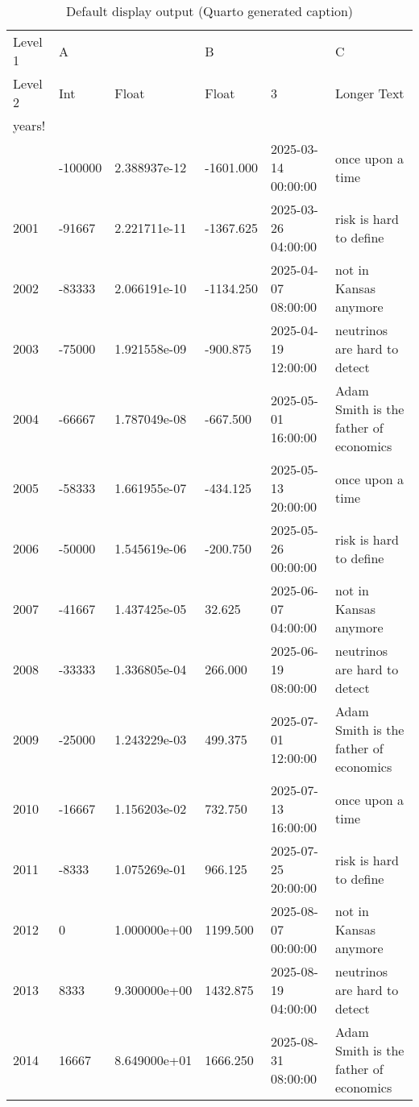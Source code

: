 \documentclass[
  11pt,
  a4paper,
  DIV=11,
  numbers=noendperiod]{scrartcl}
\begin{document}
\begin{longtable}[]{@{}llllll@{}}

\caption{\label{tbl-hard-rules}Default display output (Quarto generated
caption)}

\tabularnewline

\toprule\noalign{}
Level 1 & \multicolumn{2}{l}{%
A} & \multicolumn{2}{l}{%
B} & C \\
Level 2 & Int & Float & Float & 3 & Longer Text \\
years! & & & & & \\
\midrule\noalign{}
\endhead
\bottomrule\noalign{}
\endlastfoot
2000 & -100000 & 2.388937e-12 & -1601.000 & 2025-03-14 00:00:00 & once
upon a time \\
2001 & -91667 & 2.221711e-11 & -1367.625 & 2025-03-26 04:00:00 & risk is
hard to define \\
2002 & -83333 & 2.066191e-10 & -1134.250 & 2025-04-07 08:00:00 & not in
Kansas anymore \\
2003 & -75000 & 1.921558e-09 & -900.875 & 2025-04-19 12:00:00 &
neutrinos are hard to detect \\
2004 & -66667 & 1.787049e-08 & -667.500 & 2025-05-01 16:00:00 & Adam
Smith is the father of economics \\
2005 & -58333 & 1.661955e-07 & -434.125 & 2025-05-13 20:00:00 & once
upon a time \\
2006 & -50000 & 1.545619e-06 & -200.750 & 2025-05-26 00:00:00 & risk is
hard to define \\
2007 & -41667 & 1.437425e-05 & 32.625 & 2025-06-07 04:00:00 & not in
Kansas anymore \\
2008 & -33333 & 1.336805e-04 & 266.000 & 2025-06-19 08:00:00 & neutrinos
are hard to detect \\
2009 & -25000 & 1.243229e-03 & 499.375 & 2025-07-01 12:00:00 & Adam
Smith is the father of economics \\
2010 & -16667 & 1.156203e-02 & 732.750 & 2025-07-13 16:00:00 & once upon
a time \\
2011 & -8333 & 1.075269e-01 & 966.125 & 2025-07-25 20:00:00 & risk is
hard to define \\
2012 & 0 & 1.000000e+00 & 1199.500 & 2025-08-07 00:00:00 & not in Kansas
anymore \\
2013 & 8333 & 9.300000e+00 & 1432.875 & 2025-08-19 04:00:00 & neutrinos
are hard to detect \\
2014 & 16667 & 8.649000e+01 & 1666.250 & 2025-08-31 08:00:00 & Adam
Smith is the father of economics \\

\end{longtable}
\end{document}
